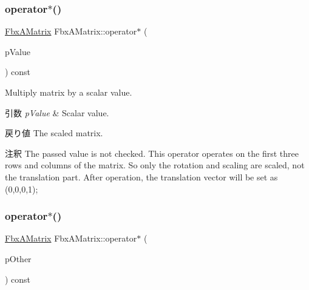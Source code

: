 \subsubsection{\texorpdfstring{operator$\ast$()}{operator*()}\hspace{0.1cm}{\footnotesize\ttfamily [1/2]}}
{\footnotesize\ttfamily \hyperlink{class_fbx_a_matrix}{Fbx\+A\+Matrix} Fbx\+A\+Matrix\+::operator$\ast$ (\begin{DoxyParamCaption}\item[{\hyperlink{class_fbx_a_matrix_ad463edbb9fea344643297701f159faa7}{double}}]{p\+Value }\end{DoxyParamCaption}) const}

Multiply matrix by a scalar value. 
\begin{DoxyParams}{引数}
{\em p\+Value} & Scalar value. \\
\hline
\end{DoxyParams}
\begin{DoxyReturn}{戻り値}
The scaled matrix. 
\end{DoxyReturn}
\begin{DoxyRemark}{注釈}
The passed value is not checked. This operator operates on the first three rows and columns of the matrix. So only the rotation and scaling are scaled, not the translation part. After operation, the translation vector will be set as (0,0,0,1); 
\end{DoxyRemark}
\mbox{\label{class_fbx_a_matrix_a653885060d7c3966ea2a778a188052c7}} 
\subsubsection{\texorpdfstring{operator$\ast$()}{operator*()}\hspace{0.1cm}{\footnotesize\ttfamily [2/2]}}
{\footnotesize\ttfamily \hyperlink{class_fbx_a_matrix}{Fbx\+A\+Matrix} Fbx\+A\+Matrix\+::operator$\ast$ (\begin{DoxyParamCaption}\item[{const \hyperlink{class_fbx_a_matrix}{Fbx\+A\+Matrix} \&}]{p\+Other }\end{DoxyParamCaption}) const}

